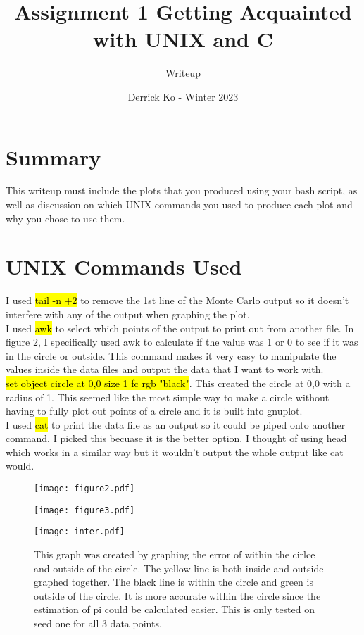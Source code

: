 \documentclass{article}
\title{\Large \textbf Assignment 1 Getting Acquainted with UNIX and C}
\author{Writeup}
\date{Derrick Ko - Winter 2023}
\begin{document}
\maketitle
\section{Summary}
This writeup must include the plots
that you produced using your bash script, as well as discussion on which UNIX commands you used to produce each plot and why you chose to use them.
\section{UNIX Commands Used}
I used \hl{tail -n +2} to remove the 1st line of the Monte Carlo output so it doesn't interfere with any of the output when graphing the plot. 
\\ [2\baselineskip] I used \hl{awk} to select which points of the output to print out from another file. In figure 2, I specifically used awk to calculate if the value was 1 or 0 to see if it was in the circle or outside. This command makes it very easy to manipulate the values inside the data files and output the data that I want to work with. 
\\ [2\baselineskip] \hl{set object circle at 0,0 size 1 fc rgb "black"}. This created the circle at 0,0 with a radius of 1. This seemed like the most simple way to make a circle without having to fully plot out points of a circle and it is built into gnuplot.  
\\ [2\baselineskip]I used \hl{cat} to print the data file as an output so it could be piped onto another command. I picked this becuase it is the better option. I thought of using head which works in a similar way but it wouldn't output the whole output like cat would. 
\begin{figure}[htp]
    \centering
    \texttt{[image: figure2.pdf]}
\end{figure}
\begin{figure}[htp]
    \centering
    \texttt{[image: figure3.pdf]}
\end{figure}
\begin{figure}[htp]
    \centering
    \texttt{[image: inter.pdf]}
    \caption{This graph was created by graphing the error of within the cirlce and outside of the circle. The yellow line is both inside and outside graphed together. The black line is within the circle and green is outside of the circle. It is more accurate within the circle since the estimation of pi could be calculated easier. This is only tested on seed one for all 3 data points.}
\end{figure}
\end{document}
